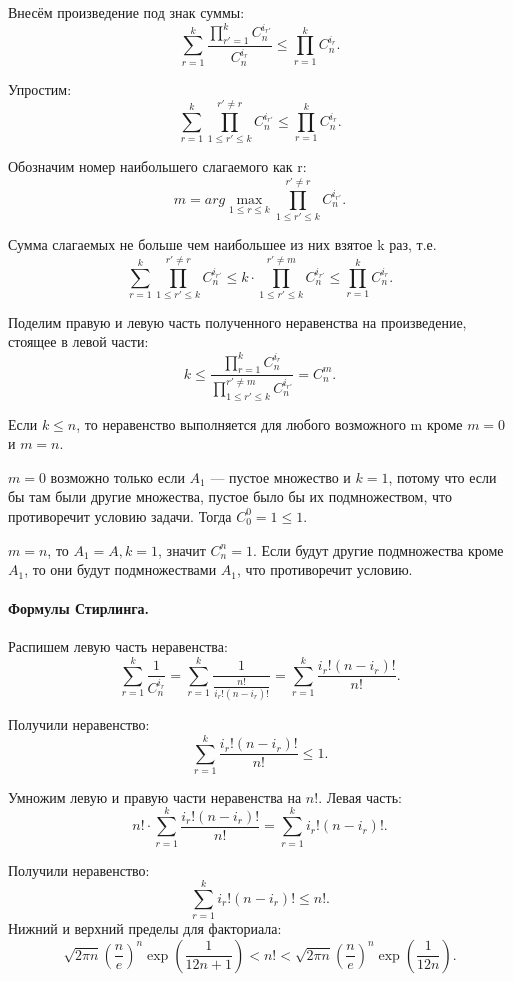 Внесём произведение под знак суммы:
$$ \sum \limits_{r=1}^k \frac{ \prod \limits_{r'=1}^k C_n^{i_{r'}}}{C_n^{i_r}} \leq
\prod \limits_{r=1}^k C_n^{i_r}. $$

Упростим:
$$ \sum \limits_{r=1}^k \prod \limits_{1 \leq r' \leq k}^{r' \neq r} C_n^{i_{r'}} \leq
\prod \limits_{r=1}^k C_n^{i_r}. $$

Обозначим номер наибольшего слагаемого как r:
$$ m = arg \max \limits_{1 \leq r \leq k} \prod \limits_{1 \leq r' \leq k}^{r' \neq r} C_n^{i_{r'}}. $$

Сумма слагаемых не больше чем наибольшее из них взятое k раз, т.е.
$$ \sum \limits_{r=1}^k \prod \limits_{1 \leq r' \leq k}^{r' \neq r} C_n^{i_{r'}} \leq
k \cdot \prod \limits_{1 \leq r' \leq k}^{r' \neq m} C_n^{i_{r'}} \leq
\prod \limits_{r=1}^k C_n^{i_r}. $$

Поделим правую и левую часть полученного неравенства на произведение, стоящее в левой части:
$$ k \leq
\frac{ \prod \limits_{r=1}^k C_n^{i_r}}{ \prod \limits_{1 \leq r' \leq k}^{r' \neq m} C_n^{i_{r'}}} =
C_n^m. $$

Если $ k \leq n $, то неравенство выполняется для любого возможного m кроме $ m = 0 $ и $ m = n $.

$ m = 0 $ возможно только если $A_1$ --- пустое множество и $k = 1$,
потому что если бы там были другие множества, пустое было бы их подмножеством, что противоречит условию задачи.
Тогда $ C_0^0 = 1 \leq 1$.

$ m = n $, то $ A_1 = A, k = 1 $, значит $C_n^n = 1$.
Если будут другие подмножества кроме $A_1$, то они будут подмножествами $A_1$, что противоречит условию.

\paragraph*{Формулы Стирлинга.}

Распишем левую часть неравенства:
$$ \sum \limits_{r=1}^k \frac{1}{C_n^{i_r}} =
\sum \limits_{r=1}^k \frac{1}{ \frac{n!}{i_{r}! \left(n-i_r\right)!} } =
\sum \limits_{r=1}^k \frac{i_{r}! \left(n-i_r\right)!}{n!}.$$

Получили неравенство:
$$\sum \limits_{r=1}^k \frac{i_{r}! \left(n-i_r\right)!}{n!} \leq 1.$$

Умножим левую и правую части неравенства на $n!$.
Левая часть:
$$ n! \cdot \sum \limits_{r=1}^k \frac{i_{r}! \left(n-i_r\right)!}{n!} =
\sum \limits_{r=1}^k i_{r}! \left(n-i_r\right)!.$$

Получили неравенство:
$$\sum \limits_{r=1}^k i_{r}! \left(n-i_r\right)! \leq n!. $$
Нижний и верхний пределы для факториала:
$$ \sqrt{2 \pi n} \left( \frac{n}{e} \right)^n \exp \left( \frac{1}{12 n+1} \right) <
n! <
\sqrt{2 \pi n} \left( \frac{n}{e} \right)^n \exp \left( \frac{1}{12 n} \right). $$

